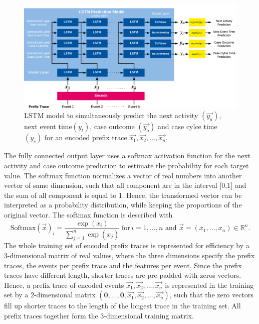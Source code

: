 \begin{figure}[!htbp]
	\centering
	\includegraphics[width=\textwidth]{figures/network}
	\caption[LSTM model for text-aware process prediction]{LSTM model to simultaneously predict the next activity $(\vec{y_a})$, next event time$(y_t)$, case outcome $(\vec{y_o})$ and case cylce time $(y_c)$ for an encoded prefix trace $\vec{x_1}, \vec{x_2}, \dots, \vec{x_n}$.}
	\label{fig:network}
\end{figure}

The fully connected output layer uses a softmax activation function for the next activity and case outcome prediction to estimate the probability for each target value.
The softmax function normalizes a vector of real numbers into another vector of same dimension, such that all component are in the interval [0,1] and the sum of all component is equal to 1.
Hence, the transformed vector can be interpreted as a probability distribution, while keeping the proportions of the original vector.
The softmax function is described with
\begin{equation*}\label{key}
	\text{Softmax}(\vec{x})_i = \frac{\exp(x_i)}{\sum_{j=1}^{n} \exp(x_j)}  \; \text{for} \, i = 1, \dots, n \text{ and } \vec{x}=(x_1, \dots, x_n) \in \mathbb{R}^n.
\end{equation*}
The whole training set of encoded prefix traces is represented for efficiency by a 3-dimensional matrix of real values, where the three dimensions specify the prefix traces, the events per prefix trace and the features per event.
Since the prefix traces have different length, shorter traces are pre-padded \cite{DBLP:journals/corr/abs-1903-07288} with zeros vectors.
Hence, a prefix trace of encoded events $\vec{x_1}, \vec{x_2}, \dots, \vec{x_n}$  is represented in the training set by a 2-dimensional matrix $(\mathbf{0}, \dots, \mathbf{0},\vec{x_1}, \vec{x_2}, \dots, \vec{x_n})$, such that the zero vectors fill up shorter traces to the length of the longest trace in the training set.
All prefix traces together form the 3-dimensional training matrix.

